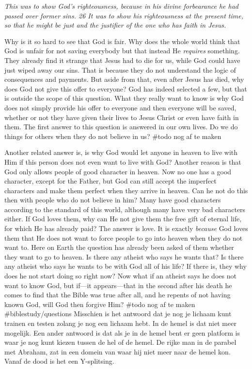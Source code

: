 \emph{This was to show God's righteousness, because in his divine
forbearance he had passed over former sins. 26 It was to show his
righteousness at the present time, so that he might be just and the
justifier of the one who has faith in Jesus.}

Why is it so hard to see that God is fair. Why does the whole world
think that God is unfair for not saving everybody but that instead He
\emph{requires} something. They already find it strange that Jesus had
to die for us, while God could have just wiped away our sins. That is
because they do not understand the logic of consequences and payments.
But aside from that, even after Jesus has died, why does God not give
this offer to everyone? God has indeed selected a few, but that is
outside the scope of this question. What they really want to know is why
God does not simply provide his offer to everyone and then everyone will
be saved, whether or not they have given their lives to Jesus Christ or
even have faith in them. The first answer to this question is answered
in our own lives. Do we do things for others when they do not believe in
us? \#todo nog af te maken

Another related answer is, is why God would let anyone in heaven to live
with Him if this person does not even want to live with God? Another
reason is that God only allows people of good character in heaven. Now
no one has a good character, except for the Father, but God can still
accept the imperfect characters and make them perfect when they arrive
in heaven. Can he not do this then with people who do not believe in
him? Many have good characters according to the standard of this world,
although many have very bad characters either. If God loves them, why
can He not give them the free gift of eternal life, for which He has
already paid? The answer is love. It is exactly \emph{because} God loves
them that He does not want to force people to go into heaven when they
do not want to. Here on Earth the question has already been asked of
them whether they want to go to heaven. Is there any atheist who says he
wants that? Is there any atheist who says he wants to be with God all of
his life? If there is, they why does he not start doing so right now?
Now what if an atheist says he does not want to know God, but if---it
appears---that in the second after his death he comes to find that the
Bible was true after all, and he repents of not having known God, will
God then forgive Him? \#todo nog af te maken \#biblestudy/questions
Misschien is het antwoord dat je nog je lichaam kunt trainen en testen
zolang je nog een lichaam hebt. In de hemel is dat niet meer mogelijk.
Een ander antwoord is dat als je in de hemel bent er geen platform is
waar je nog kunt kiezen tussen de hel of de hemel. De rijke man in de
parabel met Abraham, zat in een domein van waar hij niet meer naar de
hemel kon. Vanaf de dood is het een Y-splitsing.

